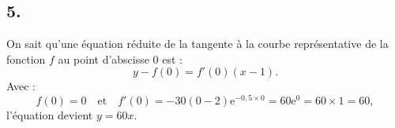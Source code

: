 \documentclass[10pt]{article}
\providecommand{\e}{{\mathrm{e}}}
\begin{document}
\subsection*{5.}

On sait qu'une équation réduite de la tangente à la courbe représentative de la fonction \( f \) au point d'abscisse 0 est :
\[
y - f(0) = f'(0)(x - 1).
\]
Avec :
\[
f(0) = 0 \quad \text{et} \quad f'(0) = -30(0 - 2)\e^{-0{,}5 \times 0} = 60 \e^0 = 60 \times 1 = 60,
\]
l'équation devient \(y = 60x\).
\end{document}
